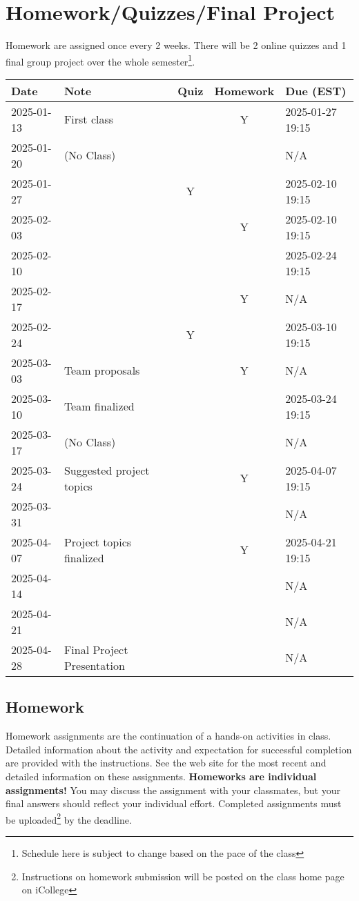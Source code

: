 \documentclass[a4paper, 12pt]{article}
\begin{document}
\section{Homework/Quizzes/Final Project}
Homework are assigned once every 2 weeks. There will be 2 online quizzes and 1 final group project over the whole semester\footnote{Schedule here is subject to change based on the pace of the class}.
\begin{center}
  \begin{tabular}{ l|l|c|c|l }
      \hline			
      Date & Note & Quiz & Homework & Due (EST)\\
      \hline
      2025-01-13 & First class &  & Y & 2025-01-27 19:15 \\
      2025-01-20 & (No Class) &  &  & N/A \\
      2025-01-27 &  & Y &  & 2025-02-10 19:15 \\
      2025-02-03 &  &  & Y & 2025-02-10 19:15 \\
      2025-02-10 &  &  &  & 2025-02-24 19:15 \\
      2025-02-17 &  &  & Y & N/A \\
      2025-02-24 &   & Y &  & 2025-03-10 19:15 \\
      2025-03-03 & Team proposals &  & Y & N/A \\
      2025-03-10 & Team finalized &  &  & 2025-03-24 19:15 \\
      2025-03-17 & (No Class) &  &  & N/A \\
      2025-03-24 & Suggested project topics &  & Y & 2025-04-07 19:15 \\
      2025-03-31 &  &  &  & N/A \\
      2025-04-07 & Project topics finalized &  & Y & 2025-04-21 19:15 \\
      2025-04-14 &  &  &  & N/A \\
      2025-04-21 &  &  &  & N/A \\
      2025-04-28 & Final Project Presentation &  &  & N/A \\
      \hline  
  \end{tabular}
\end{center}

\subsection{Homework}
Homework assignments are the continuation of a hands-on activities in class. Detailed information about the activity and expectation for successful completion are provided with the instructions. See the web site for the most recent and detailed information on these assignments. \textbf{Homeworks are individual assignments!} You may discuss the assignment with your classmates, but your ﬁnal answers should reﬂect your individual eﬀort. Completed assignments must be uploaded\footnote{Instructions on homework submission will be posted on the class home page on iCollege} by the deadline.
\end{document}
